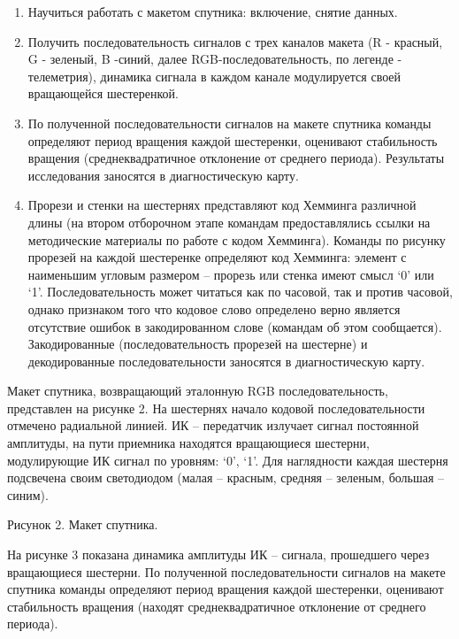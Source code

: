 \begin{enumerate}
    \item Научиться работать с макетом спутника: включение, снятие данных.
    \item Получить последовательность сигналов с трех каналов макета (R - красный, G - зеленый, B -синий, далее RGB-последовательность, по легенде - телеметрия), динамика сигнала в каждом канале модулируется своей вращающейся шестеренкой.
    \item По полученной последовательности сигналов на макете спутника команды определяют период вращения каждой шестеренки, оценивают стабильность вращения (среднеквадратичное отклонение от среднего периода). Результаты исследования заносятся в диагностическую карту.
    \item Прорези и стенки на шестернях представляют код Хемминга различной длины (на втором отборочном этапе командам предоставлялись ссылки на методические материалы по работе с кодом Хемминга). Команды по рисунку прорезей на каждой шестеренке определяют код Хемминга: элемент с наименьшим угловым размером – прорезь или стенка имеют смысл ‘0’ или ‘1’. Последовательность может читаться как по часовой, так и против часовой, однако признаком того что кодовое слово определено верно является отсутствие ошибок в закодированном слове (командам об этом сообщается). Закодированные (последовательность прорезей на шестерне) и декодированные последовательности заносятся в диагностическую карту.
\end{enumerate}

Макет спутника, возвращающий эталонную RGB последовательность, представлен на рисунке 2. На шестернях начало кодовой последовательности отмечено радиальной линией. ИК – передатчик излучает сигнал постоянной амплитуды, на пути приемника находятся вращающиеся шестерни, модулирующие ИК сигнал по уровням: ‘0’, ‘1’. Для наглядности каждая шестерня подсвечена своим светодиодом (малая – красным, средняя – зеленым, большая – синим).


\begin{center}
    Рисунок 2. Макет спутника.
\end{center}

На рисунке 3 показана динамика амплитуды ИК – сигнала, прошедшего через вращающиеся шестерни. По полученной последовательности сигналов на макете спутника команды определяют период вращения каждой шестеренки, оценивают стабильность вращения (находят среднеквадратичное отклонение от среднего периода).

